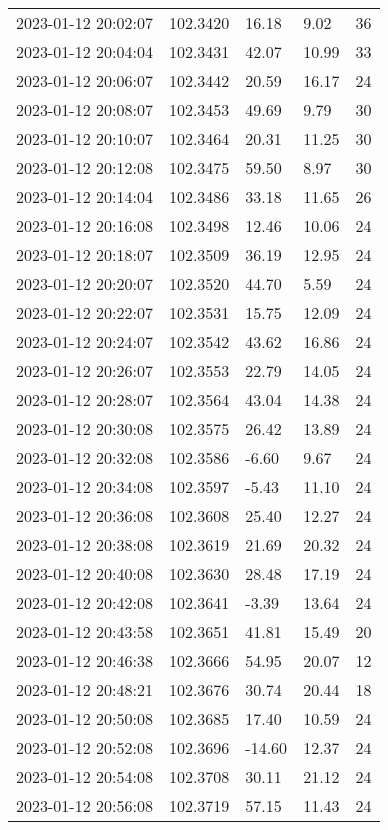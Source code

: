 \documentclass{nature_plusfigure}
\begin{document}
\begin{supplement}
\begin{center}
\begin{longtable}{lllll}
2023-01-12 20:02:07 & 102.3420 & 16.18 & 9.02 & 36 \\ 
2023-01-12 20:04:04 & 102.3431 & 42.07 & 10.99 & 33 \\ 
2023-01-12 20:06:07 & 102.3442 & 20.59 & 16.17 & 24 \\ 
2023-01-12 20:08:07 & 102.3453 & 49.69 & 9.79 & 30 \\ 
2023-01-12 20:10:07 & 102.3464 & 20.31 & 11.25 & 30 \\ 
2023-01-12 20:12:08 & 102.3475 & 59.50 & 8.97 & 30 \\ 
2023-01-12 20:14:04 & 102.3486 & 33.18 & 11.65 & 26 \\ 
2023-01-12 20:16:08 & 102.3498 & 12.46 & 10.06 & 24 \\ 
2023-01-12 20:18:07 & 102.3509 & 36.19 & 12.95 & 24 \\ 
2023-01-12 20:20:07 & 102.3520 & 44.70 & 5.59 & 24 \\ 
2023-01-12 20:22:07 & 102.3531 & 15.75 & 12.09 & 24 \\ 
2023-01-12 20:24:07 & 102.3542 & 43.62 & 16.86 & 24 \\ 
2023-01-12 20:26:07 & 102.3553 & 22.79 & 14.05 & 24 \\ 
2023-01-12 20:28:07 & 102.3564 & 43.04 & 14.38 & 24 \\ 
2023-01-12 20:30:08 & 102.3575 & 26.42 & 13.89 & 24 \\ 
2023-01-12 20:32:08 & 102.3586 & -6.60 & 9.67 & 24 \\ 
2023-01-12 20:34:08 & 102.3597 & -5.43 & 11.10 & 24 \\ 
2023-01-12 20:36:08 & 102.3608 & 25.40 & 12.27 & 24 \\ 
2023-01-12 20:38:08 & 102.3619 & 21.69 & 20.32 & 24 \\ 
2023-01-12 20:40:08 & 102.3630 & 28.48 & 17.19 & 24 \\ 
2023-01-12 20:42:08 & 102.3641 & -3.39 & 13.64 & 24 \\ 
2023-01-12 20:43:58 & 102.3651 & 41.81 & 15.49 & 20 \\ 
2023-01-12 20:46:38 & 102.3666 & 54.95 & 20.07 & 12 \\ 
2023-01-12 20:48:21 & 102.3676 & 30.74 & 20.44 & 18 \\ 
2023-01-12 20:50:08 & 102.3685 & 17.40 & 10.59 & 24 \\ 
2023-01-12 20:52:08 & 102.3696 & -14.60 & 12.37 & 24 \\ 
2023-01-12 20:54:08 & 102.3708 & 30.11 & 21.12 & 24 \\ 
2023-01-12 20:56:08 & 102.3719 & 57.15 & 11.43 & 24 \\ 

\end{longtable}
\end{center}
\end{supplement}
\end{document}
